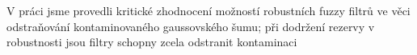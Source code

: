 
V práci jsme provedli kritické zhodnocení možností robustních fuzzy filtrů ve věci odstraňování kontaminovaného gaussovského šumu; při dodržení rezervy v robustnosti jsou filtry schopny zcela odstranit kontaminaci 